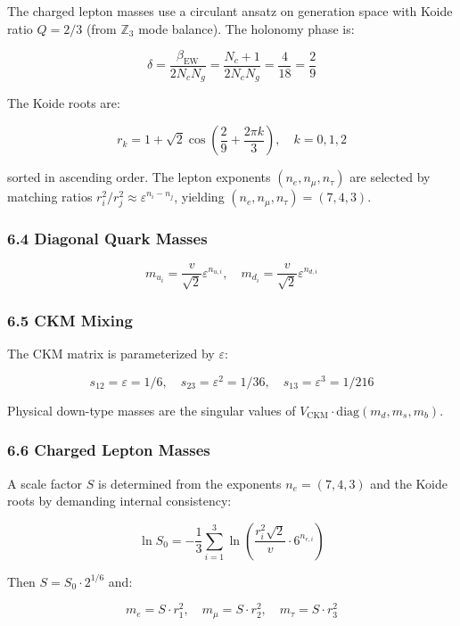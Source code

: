 The charged lepton masses use a circulant ansatz on generation space with Koide ratio \(Q = 2/3\) (from \(\mathbb{Z}_3\) mode balance). The holonomy phase is:

\[\delta = \frac{\beta_{\text{EW}}}{2 N_c N_g} = \frac{N_c + 1}{2 N_c N_g} = \frac{4}{18} = \frac{2}{9}\]

The Koide roots are:

\[r_k = 1 + \sqrt{2}\cos\left(\frac{2}{9} + \frac{2\pi k}{3}\right), \quad k = 0, 1, 2\]

sorted in ascending order. The lepton exponents \((n_e, n_\mu, n_\tau)\) are selected by matching ratios \(r_i^2/r_j^2 \approx \varepsilon^{n_i - n_j}\), yielding \((n_e, n_\mu, n_\tau) = (7, 4, 3)\).

\subsubsection{6.4 Diagonal Quark Masses}\label{64-diagonal-quark-masses}

\[m_{u_i} = \frac{v}{\sqrt{2}} \varepsilon^{n_{u,i}}, \quad m_{d_i} = \frac{v}{\sqrt{2}} \varepsilon^{n_{d,i}}\]

\subsubsection{6.5 CKM Mixing}\label{65-ckm-mixing}

The CKM matrix is parameterized by \(\varepsilon\):

\[s_{12} = \varepsilon = 1/6, \quad s_{23} = \varepsilon^2 = 1/36, \quad s_{13} = \varepsilon^3 = 1/216\]

Physical down-type masses are the singular values of \(V_{\text{CKM}} \cdot \text{diag}(m_d, m_s, m_b)\).

\subsubsection{6.6 Charged Lepton Masses}\label{66-charged-lepton-masses}

A scale factor \(S\) is determined from the exponents \(n_e = (7, 4, 3)\) and the Koide roots by demanding internal consistency:

\[\ln S_0 = -\frac{1}{3}\sum_{i=1}^3 \ln\left(\frac{r_i^2 \sqrt{2}}{v} \cdot 6^{n_{e,i}}\right)\]

Then \(S = S_0 \cdot 2^{1/6}\) and:

\[m_e = S \cdot r_1^2, \quad m_\mu = S \cdot r_2^2, \quad m_\tau = S \cdot r_3^2\]

